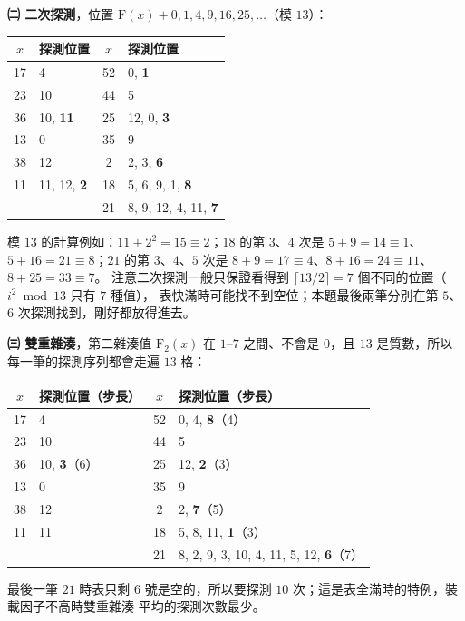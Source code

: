 \begin{pastsoln}
\textbf{㈡ 二次探測}，位置 $\mathrm{F}(x) + 0, 1, 4, 9, 16, 25, \ldots$（模 $13$）：
\begin{center}
\small
\begin{tabular}{cl|cl}
$x$ & 探測位置 & $x$ & 探測位置 \\
\hline
17 & 4 & 52 & 0, \textbf{1} \\
23 & 10 & 44 & 5 \\
36 & 10, \textbf{11} & 25 & 12, 0, \textbf{3} \\
13 & 0 & 35 & 9 \\
38 & 12 & 2 & 2, 3, \textbf{6} \\
11 & 11, 12, \textbf{2} & 18 & 5, 6, 9, 1, \textbf{8} \\
   &                      & 21 & 8, 9, 12, 4, 11, \textbf{7} \\
\end{tabular}
\end{center}
模 $13$ 的計算例如：$11 + 2^2 = 15 \equiv 2$；$18$ 的第 $3$、$4$ 次是 $5 + 9 = 14 \equiv 1$、$5 + 16 = 21 \equiv 8$；$21$ 的第 $3$、$4$、$5$ 次是 $8 + 9 = 17 \equiv 4$、$8 + 16 = 24 \equiv 11$、$8 + 25 = 33 \equiv 7$。
注意二次探測一般只保證看得到 $\lceil 13/2 \rceil = 7$ 個不同的位置（$i^2 \bmod 13$ 只有 $7$ 種值），
表快滿時可能找不到空位；本題最後兩筆分別在第 $5$、$6$ 次探測找到，剛好都放得進去。

\textbf{㈢ 雙重雜湊}，第二雜湊值 $\mathrm{F}_2(x)$ 在 $1$--$7$ 之間、不會是 $0$，且 $13$ 是質數，所以
每一筆的探測序列都會走遍 $13$ 格：
\begin{center}
\small
\begin{tabular}{cl|cl}
$x$ & 探測位置（步長） & $x$ & 探測位置（步長） \\
\hline
17 & 4 & 52 & 0, 4, \textbf{8}（4） \\
23 & 10 & 44 & 5 \\
36 & 10, \textbf{3}（6） & 25 & 12, \textbf{2}（3） \\
13 & 0 & 35 & 9 \\
38 & 12 & 2 & 2, \textbf{7}（5） \\
11 & 11 & 18 & 5, 8, 11, \textbf{1}（3） \\
   &    & 21 & 8, 2, 9, 3, 10, 4, 11, 5, 12, \textbf{6}（7） \\
\end{tabular}
\end{center}
最後一筆 $21$ 時表只剩 $6$ 號是空的，所以要探測 $10$ 次；這是表全滿時的特例，裝載因子不高時雙重雜湊
平均的探測次數最少。


\end{pastsoln}
